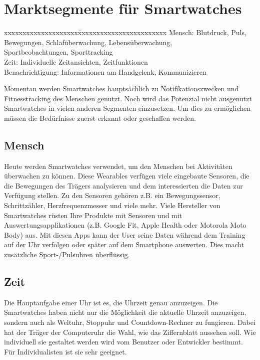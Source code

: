 \section{Marktsegmente für Smartwatches}
\begin{tabbing}
xxxxxxxxxxxxxxxxxxxx\=xxxxxxxxxxxxxxxxxxxxxxxx	\kill
Mensch:		          \> Blutdruck, Puls, Bewegungen, Schlafüberwachung, Lebensüberwachung, \\\>Sportbeobachtungen, Sporttracking \\
Zeit:			          \> Individuelle Zeitansichten, Zeitfunktionen \\
Benachrichtigung:	  \> Informationen am Handgelenk, Kommunizieren
\end{tabbing}
Momentan werden Smartwatches hauptsächlich zu Notifikationszwecken und Fitnesstracking des Menschen genutzt. Noch wird das Potenzial nicht ausgenutzt Smartwatches in vielen anderen Segmenten einzusetzen. Um dies zu ermöglichen müssen die Bedürfnisse zuerst erkannt oder geschaffen werden.

\subsection{Mensch}
Heute werden Smartwatches verwendet, um den Menschen bei Aktivitäten überwachen zu können. Diese Wearables verfügen viele eingebaute Sensoren, die die Bewegungen des Trägers analysieren und dem interessierten die Daten zur Verfügung stellen. Zu den Sensoren gehören z.B. ein Bewegungssensor, Schrittzähler, Herzfrequenzmesser und viele mehr. Viele Hersteller von Smartwatches rüsten Ihre Produkte mit Sensoren und mit Auswertungsapplikationen (z.B. Google Fit, Apple Health oder Motorola Moto Body) aus. Mit diesen Apps kann der User seine Daten während dem Training auf der Uhr verfolgen oder später auf dem Smartphone auswerten. Dies macht zusätzliche Sport-/Pulsuhren überflüssig.

\subsection{Zeit}
Die Hauptaufgabe einer Uhr ist es, die Uhrzeit genau anzuzeigen. Die Smartwatches haben nicht nur die Möglichkeit die aktuelle Uhrzeit anzuzeigen, sondern auch als Weltuhr, Stoppuhr und Countdown-Rechner zu fungieren. Dabei hat der Träger der Computeruhr die Wahl, wie das Ziffernblatt aussehen soll. Wie individuell sie gestaltet werden wird vom Benutzer oder Entwickler bestimmt. Für Individualisten ist sie sehr geeignet.

